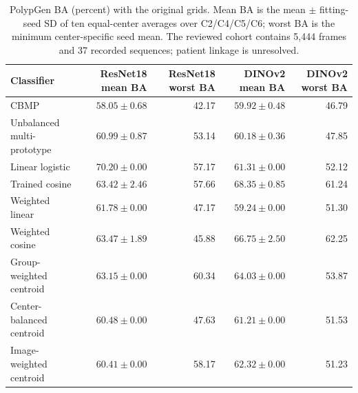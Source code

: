 \begin{table}[!htbp]
\centering\small
\setlength{\tabcolsep}{4pt}
\begin{tabular}{lrrrr}
\hline
Classifier & ResNet18 mean BA & ResNet18 worst BA & DINOv2 mean BA & DINOv2 worst BA \\
\hline
CBMP & $58.05\pm0.68$ & 42.17 & $59.92\pm0.48$ & 46.79 \\
Unbalanced multi-prototype & $60.99\pm0.87$ & 53.14 & $60.18\pm0.36$ & 47.85 \\
Linear logistic & $70.20\pm0.00$ & 57.17 & $61.31\pm0.00$ & 52.12 \\
Trained cosine & $63.42\pm2.46$ & 57.66 & $68.35\pm0.85$ & 61.24 \\
Weighted linear & $61.78\pm0.00$ & 47.17 & $59.24\pm0.00$ & 51.30 \\
Weighted cosine & $63.47\pm1.89$ & 45.88 & $66.75\pm2.50$ & 62.25 \\
Group-weighted centroid & $63.15\pm0.00$ & 60.34 & $64.03\pm0.00$ & 53.87 \\
Center-balanced centroid & $60.48\pm0.00$ & 47.63 & $61.21\pm0.00$ & 51.53 \\
Image-weighted centroid & $60.41\pm0.00$ & 58.17 & $62.32\pm0.00$ & 51.23 \\
\hline
\end{tabular}
\caption{PolypGen BA (percent) with the original grids. Mean BA is the mean $\pm$ fitting-seed SD of ten equal-center averages over C2/C4/C5/C6; worst BA is the minimum center-specific seed mean. The reviewed cohort contains 5,444 frames and 37 recorded sequences; patient linkage is unresolved.}
\label{tab:polypgen_results}
\end{table}
